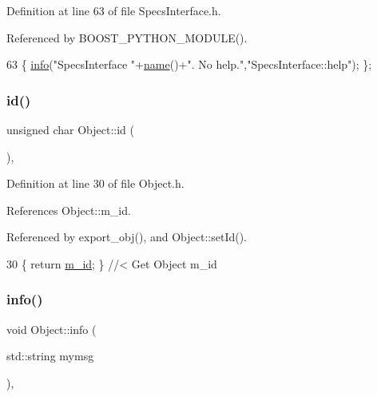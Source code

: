 Definition at line 63 of file Specs\+Interface.\+h.



Referenced by B\+O\+O\+S\+T\+\_\+\+P\+Y\+T\+H\+O\+N\+\_\+\+M\+O\+D\+U\+L\+E().


\begin{DoxyCode}
63 \{ \hyperlink{classObject_a644fd329ea4cb85f54fa6846484b84a8}{info}(\textcolor{stringliteral}{"SpecsInterface "}+\hyperlink{classObject_a300f4c05dd468c7bb8b3c968868443c1}{name}()+\textcolor{stringliteral}{". No help."},\textcolor{stringliteral}{"SpecsInterface::help"}); \};
\end{DoxyCode}
\mbox{\label{classObject_af99145335cc61ff6e2798ea17db009d2}} 
\subsubsection{\texorpdfstring{id()}{id()}}
{\footnotesize\ttfamily unsigned char Object\+::id (\begin{DoxyParamCaption}{ }\end{DoxyParamCaption})\hspace{0.3cm}{\ttfamily [inline]}, {\ttfamily [inherited]}}



Definition at line 30 of file Object.\+h.



References Object\+::m\+\_\+id.



Referenced by export\+\_\+obj(), and Object\+::set\+Id().


\begin{DoxyCode}
30 \{ \textcolor{keywordflow}{return} \hyperlink{classObject_aca74b9dbfed7b5556ea2d56c65b6b6b0}{m\_id};         \} \textcolor{comment}{//< Get Object m\_id }
\end{DoxyCode}
\mbox{\label{classObject_a644fd329ea4cb85f54fa6846484b84a8}} 
\subsubsection{\texorpdfstring{info()}{info()}\hspace{0.1cm}{\footnotesize\ttfamily [1/2]}}
{\footnotesize\ttfamily void Object\+::info (\begin{DoxyParamCaption}\item[{std\+::string}]{mymsg }\end{DoxyParamCaption})\hspace{0.3cm}{\ttfamily [inline]}, {\ttfamily [inherited]}}



